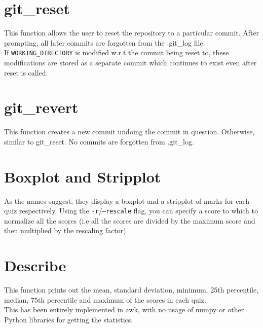 \documentclass{article}
\begin{document}
    \section{git\_reset}
    This function allows the user to reset the repository to a particular commit. After prompting, all later commits are forgotten from the .git\_log file.\\
    If \texttt{WORKING\_DIRECTORY} is modified w.r.t the commit being reset to, these modifications are stored as a separate commit which continues to exist even after reset is called.\\

    \section{git\_revert}
    This function creates a new commit undoing the commit in question. Otherwise, similar to git\_reset. No commits are forgotten from .git\_log.

    \section{Boxplot and Stripplot}
    As the names suggest, they display a boxplot and a stripplot of marks for each quiz respectively. Using the \texttt{-r}/\texttt{--rescale} flag, you can specify a score to which to normalize all the scores (i.e all the scores are divided by the maximum score and then multiplied by the rescaling factor).

    \section{Describe}
    This function prints out the mean, standard deviation, minimum, 25th percentile\cite{url:quartile}, median, 75th percentile and maximum of the scores in each quiz.\\
    This has been entirely implemented in awk\cite{url:sorting_1}\cite{url:sorting_2}, with no usage of numpy or other Python libraries for getting the statistics.
    \printbibliography
\end{document}

